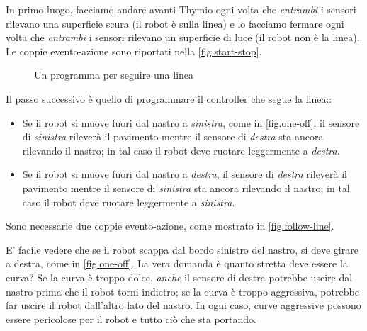In primo luogo, facciamo andare avanti Thymio ogni volta che \emph{entrambi}  i sensori rilevano
una superficie scura (il robot è sulla linea) e lo facciamo fermare ogni volta che \emph{entrambi}  i sensori rilevano un
superficie di luce (il robot non è la linea).
Le coppie evento-azione sono riportati nella \cref{fig.start-stop}.



\begin{figure}
	\hfill
	\caption{Un programma per seguire una linea}
\end{figure}


Il passo successivo è quello di programmare il controller che segue la linea::
\begin{itemize}

\item Se il robot si muove fuori dal nastro a \emph{sinistra}, come in \cref{fig.one-off}, il
 sensore di \emph{sinistra} rileverà il pavimento mentre il sensore di \emph{destra}
sta ancora rilevando il nastro; in tal caso il robot deve ruotare leggermente
a \emph{destra}.
\item Se il robot si muove fuori dal nastro a \emph{destra}, il
 sensore di \emph{destra} rileverà il pavimento mentre il sensore di \emph{sinistra}
sta ancora rilevando il nastro; in tal caso il robot deve ruotare leggermente
a \emph{sinistra}.

\end{itemize}

Sono necessarie due coppie evento-azione, come mostrato in \cref{fig.follow-line}.


E' facile vedere che se il robot scappa dal bordo sinistro del nastro, si deve girare a destra, come in \cref{fig.one-off}.
La vera domanda è quanto stretta deve essere la curva?
Se la curva è troppo dolce, \emph{anche} il sensore di destra potrebbe uscire dal nastro prima che il robot torni indietro;
se la curva è troppo aggressiva, potrebbe far uscire il robot dall'altro lato del nastro. In ogni caso, curve aggressive possono essere pericolose per il robot e tutto ciò che sta portando.

